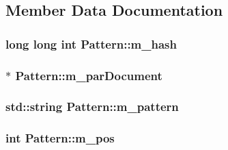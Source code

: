 \subsection{Member Data Documentation}
\subsubsection[{\texorpdfstring{m\+\_\+hash}{m_hash}}]{\setlength{\rightskip}{0pt plus 5cm}long long int Pattern\+::m\+\_\+hash\hspace{0.3cm}{\ttfamily [private]}}\hypertarget{class_pattern_ad2d90cf1c416dd89f29e7da860a02bfb}{}\label{class_pattern_ad2d90cf1c416dd89f29e7da860a02bfb}
\subsubsection[{\texorpdfstring{m\+\_\+par\+Document}{m_parDocument}}]{$\ast$ Pattern\+::m\+\_\+par\+Document\hspace{0.3cm}{\ttfamily [private]}}\hypertarget{class_pattern_a3ce8a1a5ba37412027278315935c06b8}{}\label{class_pattern_a3ce8a1a5ba37412027278315935c06b8}
\subsubsection[{\texorpdfstring{m\+\_\+pattern}{m_pattern}}]{\setlength{\rightskip}{0pt plus 5cm}std\+::string Pattern\+::m\+\_\+pattern\hspace{0.3cm}{\ttfamily [private]}}\hypertarget{class_pattern_a492ef4124f2dfebee1babe983cf3f726}{}\label{class_pattern_a492ef4124f2dfebee1babe983cf3f726}
\subsubsection[{\texorpdfstring{m\+\_\+pos}{m_pos}}]{\setlength{\rightskip}{0pt plus 5cm}int Pattern\+::m\+\_\+pos\hspace{0.3cm}{\ttfamily [private]}}\hypertarget{class_pattern_aa5b42830eafc550988e9156e4c370f67}{}\label{class_pattern_aa5b42830eafc550988e9156e4c370f67}
